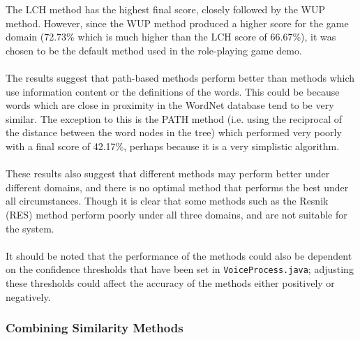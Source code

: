 \documentclass[11pt]{article}
\begin{document}
The LCH method has the highest final score, closely followed by the WUP method. However, since the WUP method produced a higher score for the game domain (72.73\% which is much higher than the LCH score of 66.67\%), it was chosen to be the default method used in the role-playing game demo.
\\
\\
The results suggest that path-based methods perform better than methods which use information content or the definitions of the words. This could be because words which are close in proximity in the WordNet database tend to be very similar. The exception to this is the PATH method (i.e. using the reciprocal of the distance between the word nodes in the tree) which performed very poorly with a final score of 42.17\%, perhaps because it is a very simplistic algorithm.
\\
\\
These results also suggest that different methods may perform better under different domains, and there is no optimal method that performs the best under all circumstances. Though it is clear that some methods such as the Resnik (RES) method perform poorly under all three domains, and are not suitable for the system.
\\
\\
It should be noted that the performance of the methods could also be dependent on the confidence thresholds that have been set in \texttt{VoiceProcess.java}; adjusting these thresholds could affect the accuracy of the methods either positively or negatively.

\subsubsection{Combining Similarity Methods}
\end{document}
